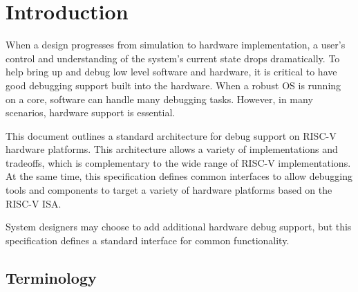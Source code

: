 \chapter{Introduction}
\label{sec:intro}

When a design progresses from simulation to hardware implementation, a user's
control and understanding of the system's current state drops dramatically.
To help bring up and debug low level software and hardware,
it is critical to have good debugging support built into the hardware.
When a robust OS is running on a core, software can handle many
debugging tasks. However, in many scenarios, hardware support is essential.

This document outlines a standard architecture for debug support
on RISC-V hardware platforms. This architecture allows a variety of implementations and
tradeoffs, which is complementary to the wide range of RISC-V implementations.
At the same time, this specification defines common interfaces to
allow debugging tools and components to target a variety of hardware
platforms based on the RISC-V ISA.

System designers may choose to add additional hardware debug support,
but this specification defines a standard interface for common
functionality.

\section{Terminology}

